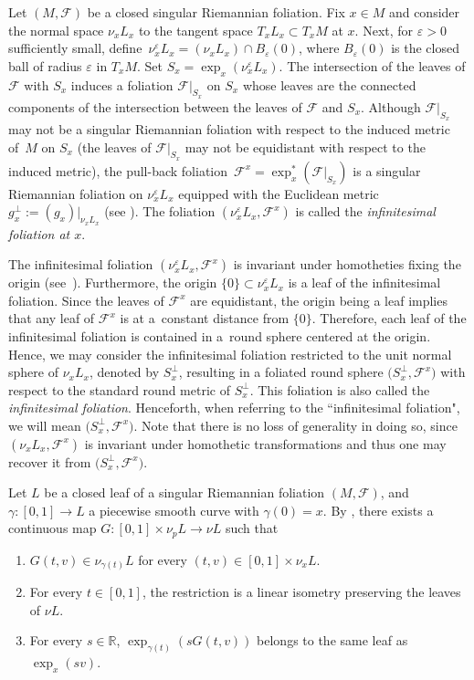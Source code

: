 \documentclass[pdftex]{sigma}
\numberwithin{equation}{section}
\theoremstyle{definition}
\newcommand{\fol}{\mathcal{F}}
\begin{document}
Let $(M,\fol)$ be a closed singular Riemannian foliation. Fix $x\in M$ and consider the normal space $\nu_x L_x$ to the tangent space $T_xL_x\subset T_x M$ at $x$.
Next, for $\varepsilon > 0$ sufficiently small, define~${\nu_x^\varepsilon L_x = (\nu_x L_x) \cap B_{\varepsilon}(0)}$, where $B_{\varepsilon}(0)$ is the closed ball of radius $\varepsilon$ in $T_x M$.
Set $S_x = \exp_{x}(\nu_x^\varepsilon L_x)$.
The intersection of the leaves of $\fol$ with $S_x$ induces a foliation $\fol |_{S_x}$ on $S_x$ whose leaves are the connected components of the intersection between the leaves of $\fol$ and $S_x$.
Although $\fol|_{S_x}$ may not be a singular Riemannian foliation with respect to the induced metric of~$M$ on $S_x$ (the leaves of $\fol|_{S_x}$ may not be equidistant with respect to the induced metric), the pull-back foliation~${\fol^x = \exp_x^{\ast}(\fol|_{S_x})}$ is a singular Riemannian foliation on $\nu_x^\varepsilon L_x$ equipped with the Euclidean metric $g^\perp_x:=(g_x)|_{\nu_x L_x}$ (see \cite[Proposition~6.5]{Molino}).
The foliation $(\nu_x^\varepsilon L_x, \fol^x)$ is called the \emph{infinitesimal foliation at $x$}.

The infinitesimal foliation $(\nu_x^\varepsilon L_x, \fol^x)$ is invariant under homotheties fixing the origin (see~\cite[Lemma~6.2]{Molino}). Furthermore, the origin $\{0\}\subset \nu_x^\varepsilon L_x$ is a leaf of the infinitesimal foliation.
Since the leaves of $\fol^x$ are equidistant, the origin being a leaf implies that any leaf of $\fol^x$ is at a~constant distance from $\{0\}$. Therefore, each leaf of the infinitesimal foliation is contained in a~round sphere centered at the origin.
Hence, we may consider the infinitesimal foliation restricted to the unit normal sphere of $\nu_x L_x$, denoted by $S^{\bot}_x$, resulting in a foliated round sphere $\bigl(S^{\bot}_x, \fol^x\bigr)$ with respect to the standard round metric of $S^{\bot}_x$. This foliation is also called the \emph{infinitesimal foliation}. Henceforth, when referring to the ``infinitesimal foliation", we will mean $\bigl(S^{\bot}_x, \fol^x\bigr)$. Note that there is no loss of generality in doing so, since $(\nu_x L_x, \fol^x)$ is invariant under homothetic transformations and thus one may recover it from $\bigl(S^{\bot}_x, \fol^x\bigr)$.




Let $L$ be a closed leaf of a singular Riemannian foliation $(M, \mathcal{F})$,
and $\gamma\colon [0,1] \to L$ a piecewise smooth curve with $\gamma(0) = x $. By \cite{Mendes2020}, there exists a continuous map
$G\colon [0,1] \times \nu_p L \to \nu L$
such that
\begin{enumerate}\itemsep=0pt
 \item[(a)] \( G(t, v) \in \nu_{\gamma(t)} L \) for every \( (t, v) \in [0,1] \times \nu_x L \).
 \item[(b)] For every \( t \in [0,1] \), the restriction
 is a linear isometry preserving the leaves of \( \nu L \).
 \item[(c)] For every \( s \in \mathbb{R} \), \( \exp_{\gamma(t)} (sG(t, v)) \) belongs to the same leaf as \( \exp_x (sv) \).
\end{enumerate}
\end{document}
